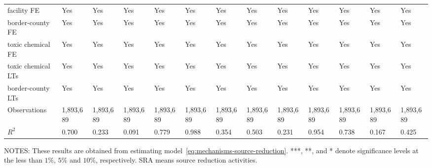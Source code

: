 \begin{table}[H]
{\begin{tabular}{@{}lllllllllllll@{}}
            facility FE           & Yes       & Yes       & Yes             & Yes        & Yes                   & Yes       & Yes       & Yes           & Yes       & Yes       & Yes                 & Yes                 \\
            border-county FE      & Yes       & Yes       & Yes             & Yes        & Yes                   & Yes       & Yes       & Yes           & Yes       & Yes       & Yes                 & Yes                 \\
            toxic chemical FE     & Yes       & Yes       & Yes             & Yes        & Yes                   & Yes       & Yes       & Yes           & Yes       & Yes       & Yes                 & Yes                 \\
            toxic chemical LTs    & Yes       & Yes       & Yes             & Yes        & Yes                   & Yes       & Yes       & Yes           & Yes       & Yes       & Yes                 & Yes                 \\
            border-county LTs     & Yes       & Yes       & Yes             & Yes        & Yes                   & Yes       & Yes       & Yes           & Yes       & Yes       & Yes                 & Yes                 \\ \midrule
            Observations          & 1,893,689 & 1,893,689 & 1,893,689       & 1,893,689  & 1,893,689             & 1,893,689 & 1,893,689 & 1,893,689     & 1,893,689 & 1,893,689 & 1,893,689           & 1,893,689           \\
            $R^2$                 & 0.700     & 0.233     & 0.091           & 0.779      & 0.988                 & 0.354     & 0.503     & 0.231         & 0.954     & 0.738     & 0.167               & 0.425               \\ \bottomrule\bottomrule
        \end{tabular}%
    }
    \begin{minipage}{\columnwidth}
        \vspace{0.05in}
        \tiny NOTES: These results are obtained from estimating model~\ref{eq:mechanisms-source-reduction}. ***, **, and * denote significance levels at the less than $1\%$, $5\%$ and $10\%$, respectively. SRA means source reduction activities.
    \end{minipage}
\end{table}
